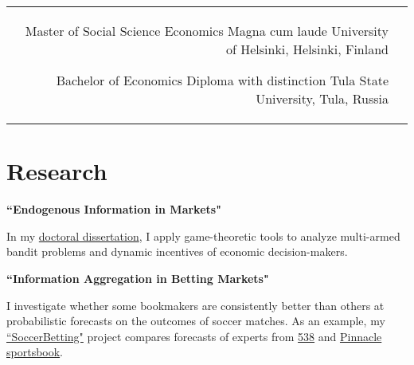 \documentclass[10pt]{article} %
\begin{document}
\begin{paracol}{2}
\begin{supertabular}{rl}
	{Master of Social Science} %
	{Economics} %
	{Magna cum laude}
	{University of Helsinki, Helsinki, Finland} %
	
	
	{Bachelor of Economics} %
	{}
	{Diploma with distinction}
	{Tula State University, Tula, Russia} %
	

\end{supertabular}

\medskip %


\section{Research}

{\raggedright\textbf{``Endogenous Information in Markets"}\\\medskip}

In my \href{https://github.com/anzhukov3/Doctoral-research}{doctoral dissertation}, I apply game-theoretic tools to analyze multi-armed bandit problems and dynamic incentives of economic decision-makers. \\

{\raggedright\textbf{``Information Aggregation in Betting Markets"}\\\medskip}

I investigate whether some bookmakers are consistently better than others at probabilistic forecasts on the outcomes of soccer matches. As an example, my \href{https://github.com/anzhukov3/SoccerBetting}{``SoccerBetting"} project compares forecasts of experts from \href{https://projects.fivethirtyeight.com/soccer-predictions/matches/}{538} and \href{https://www.pinnacle.bet/en/soccer/matchups/highlights}{Pinnacle sportsbook}.  \vspace{5pt}



\end{paracol}
\end{document}
